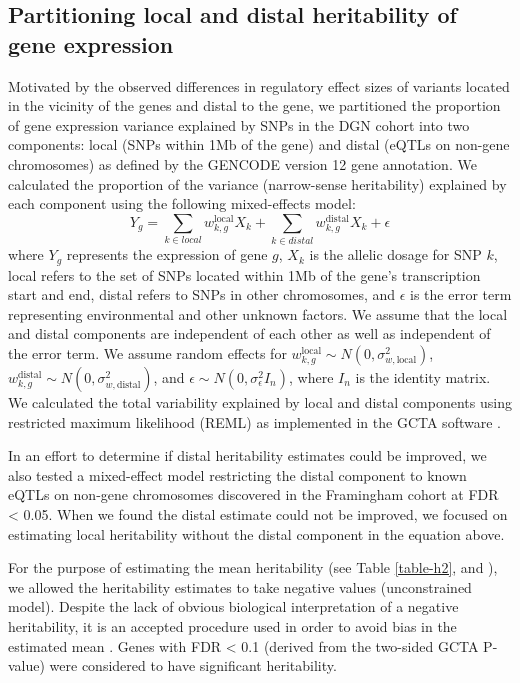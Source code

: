 \documentclass[10pt,letterpaper]{article}
\begin{document}
\subsection*{Partitioning local and distal heritability of gene
expression}\label{partitioning-local-and-distal-heritability-of-gene-expression}

Motivated by the observed differences in regulatory effect sizes of variants located in the vicinity of the genes and distal to the gene,
we partitioned the proportion of gene expression variance explained by
SNPs in the DGN cohort into two components: local (SNPs within 1Mb of
the gene) and distal (eQTLs on non-gene chromosomes) as defined by the
GENCODE \cite{Harrow_2012} version 12 gene annotation. We calculated the
proportion of the variance (narrow-sense heritability) explained by each
component using the following mixed-effects model:
%
\[ Y_g = \sum_{k  \in local}w^\text{local}_{k,g} X_k + \sum_{k  \in distal}w^\text{distal}_{k,g} X_k + \epsilon \]
%
where $Y_g$ represents the expression of gene $g$, $X_k$ is the allelic dosage for SNP $k$, local refers to the set of SNPs located within 1Mb of the gene's transcription start and end, distal refers to SNPs in other chromosomes, and $\epsilon$ is the error term representing environmental and other unknown factors. We assume that the local and distal components are independent of each other as well as independent of the error term.
We assume random effects for \(w^\text{local}_{k,g} \sim N(0, \sigma^2_{w,\text{local}})\), \(w^\text{distal}_{k,g} \sim N(0, \sigma^2_{w,\text{distal}})\), and
\(\epsilon \sim N(0, \sigma^2_{\epsilon} I_n)\), where \(I_n\) is the
identity matrix. We calculated the total variability explained by local
and distal components using restricted
maximum likelihood (REML) as implemented in the GCTA software \cite{Yang_2011}. 

In an effort to determine if distal heritability estimates could be improved, we also tested a mixed-effect model restricting the distal component to known eQTLs on non-gene chromosomes discovered in the Framingham cohort at FDR \textless{} 0.05. When we found the distal estimate could not be improved, we focused on estimating local heritability without the distal component in the equation above.

For the purpose of estimating the mean heritability (see Table \ref{table-h2},  and ), we allowed the heritability estimates to 
take negative values (unconstrained model). Despite the lack of obvious biological interpretation of a negative heritability, 
it is an accepted procedure used in order to avoid bias in the estimated mean \cite{Price_2011,Wright_2014}. Genes with FDR \textless{} 0.1 (derived from the two-sided GCTA P-value) were considered to have significant heritability. 
\end{document}
